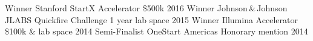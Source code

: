 \begin{cvhonors}
  \cvhonor
    {Winner}
    {Stanford StartX Accelerator}
    {\$500k}
    {2016}
  \cvhonor
    {Winner}
    {Johnson\,\&\,Johnson JLABS Quickfire Challenge}
    {1 year lab space}
    {2015}
  \cvhonor
    {Winner}
    {Illumina Accelerator}
    {\$100k \& lab space}
    {2014}
  \cvhonor
    {Semi-Finalist}
    {OneStart Americas}
    {Honorary mention}
    {2014}
\end{cvhonors}
